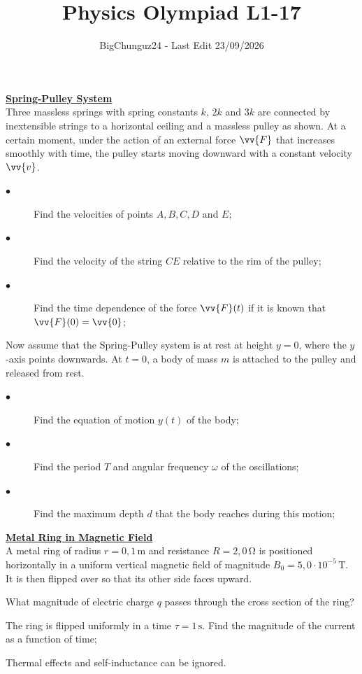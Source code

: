 \documentclass[a4paper]{article}
\title{\Huge Physics Olympiad L1-17}
\author{BigChunguz24 - Last Edit 23/09/2026}
\date{}
\begin{document}
	\maketitle
	
	\vspace{-1.25em}
	\Problem
	\textbf{\underline{Spring-Pulley System}}
	\\
	Three massless springs with spring constants $k$, $2k$ and $3k$ are connected by inextensible strings to a horizontal ceiling and a massless pulley as shown. At a certain moment, under the action of an external force $\vv{F}$ that increases smoothly with time, the pulley starts moving downward with a constant velocity $\vv{v}$.
	\begin{description}
		\item[$\bullet$] Find the velocities of points $A, B, C, D$ and $E$;
		\item[$\bullet$] Find the velocity of the string $CE$ relative to the rim of the pulley;
		\item[$\bullet$] Find the time dependence of the force $\vv{F}(t)$ if it is known that $\vv{F}(0) = \vv{0}$;
	\end{description}
	Now assume that the Spring-Pulley system is at rest at height $y=0$, where the $y$-axis points downwards. At $t=0$, a body of mass $m$ is attached to the pulley and released from rest.
	\begin{description}
		\item[$\bullet$] Find the equation of motion $y(t)$ of the body;
		\item[$\bullet$] Find the period $T$ and angular frequency $\omega$ of the oscillations;
		\item[$\bullet$] Find the maximum depth $d$ that the body reaches during this motion;
	\end{description}
	
	
	
	\Problem 
	\textbf{\underline{Metal Ring in Magnetic Field}}
	\\
	A metal ring of radius $r = 0{,}1\,\mathrm{m}$ and resistance $R = 2{,}0\,\mathrm{\Omega}$ is positioned horizontally in a uniform vertical magnetic field of magnitude $B_0 = 5{,}0\cdot10^{-5}\,\mathrm{T}$. It is then flipped over so that its other side faces upward.
	\begin{description}[leftmargin=!, labelwidth=\widthof{$\bullet$}]
		\item[$\bullet$] What magnitude of electric charge $q$ passes through the cross section of the ring?
		\item[$\bullet$] The ring is flipped uniformly in a time $\tau = 1\,\mathrm{s}$. Find the magnitude of the current as a function of time;
	\end{description}
	Thermal effects and self-inductance can be ignored.
\end{document}
